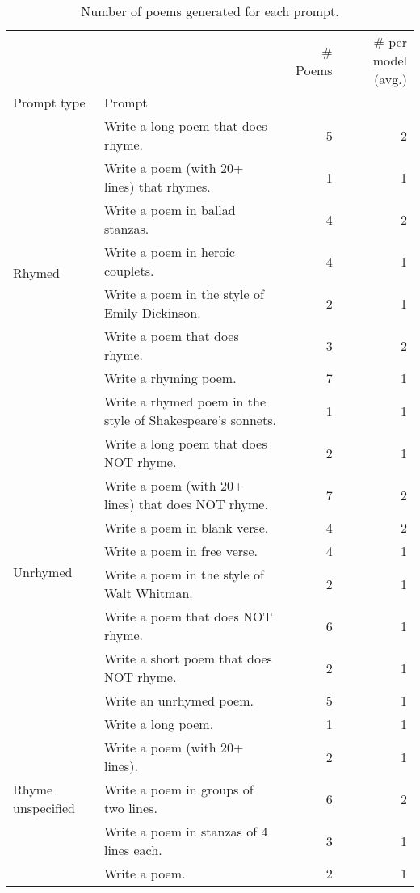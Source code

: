 \begin{table}[H]
  \centering
  \small
  \singlespacing
  \begin{tabular}{llrr}
  \toprule
   &  & \# Poems & \# per model (avg.) \\
  Prompt type & Prompt &  &  \\
  \midrule
  \multirow[t]{8}{*}{Rhymed} & Write a long poem that does rhyme. & 5 & 2 \\
   & Write a poem (with 20+ lines) that rhymes. & 1 & 1 \\
   & Write a poem in ballad stanzas. & 4 & 2 \\
   & Write a poem in heroic couplets. & 4 & 1 \\
   & Write a poem in the style of Emily Dickinson. & 2 & 1 \\
   & Write a poem that does rhyme. & 3 & 2 \\
   & Write a rhyming poem. & 7 & 1 \\
   & Write a rhymed poem in the style of Shakespeare's sonnets. & 1 & 1 \\
  \cline{1-4}
  \multirow[t]{8}{*}{Unrhymed} & Write a long poem that does NOT rhyme. & 2 & 1 \\
   & Write a poem (with 20+ lines) that does NOT rhyme. & 7 & 2 \\
   & Write a poem in blank verse. & 4 & 2 \\
   & Write a poem in free verse. & 4 & 1 \\
   & Write a poem in the style of Walt Whitman. & 2 & 1 \\
   & Write a poem that does NOT rhyme. & 6 & 1 \\
   & Write a short poem that does NOT rhyme. & 2 & 1 \\
   & Write an unrhymed poem. & 5 & 1 \\
  \cline{1-4}
  \multirow[t]{5}{*}{Rhyme unspecified} & Write a long poem. & 1 & 1 \\
   & Write a poem (with 20+ lines). & 2 & 1 \\
   & Write a poem in groups of two lines. & 6 & 2 \\
   & Write a poem in stanzas of 4 lines each. & 3 & 1 \\
   & Write a poem. & 2 & 1 \\
  \bottomrule
  \end{tabular}
  \caption{Number of poems generated for each prompt.}
  \label{tab:num_poems_rhyme_promptings}
\end{table}